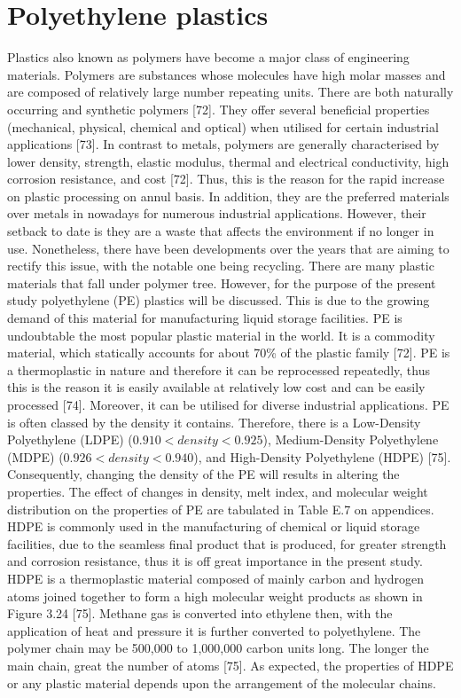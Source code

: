 \documentclass[12pt]{report}
\begin{document}
\section{Polyethylene plastics}
Plastics also known as polymers have become a major class of engineering materials. Polymers are substances whose molecules have high molar masses and are composed of relatively large number repeating units. There are both naturally occurring and synthetic polymers [72]. They offer several beneficial properties (mechanical, physical, chemical and optical) when utilised for certain industrial applications [73]. In contrast to metals, polymers are generally characterised by lower density, strength, elastic modulus, thermal and electrical conductivity, high corrosion resistance, and cost [72]. Thus, this is the reason for the rapid increase on plastic processing on annul basis. In addition, they are the preferred materials over metals in nowadays for numerous industrial applications. However, their setback to date is they are a waste that affects the environment if no longer in use. Nonetheless, there have been developments over the years that are aiming to rectify this issue, with the notable one being recycling.  
There are many plastic materials that fall under polymer tree. However, for the purpose of the present study polyethylene (PE) plastics will be discussed. This is due to the growing demand of this material for manufacturing liquid storage facilities. PE is undoubtable the most popular plastic material in the world. It is a commodity material, which statically accounts for about 70\% of the plastic family [72].  PE is a thermoplastic in nature and therefore it can be reprocessed repeatedly, thus this is the reason it is easily available at relatively low cost and can be easily processed [74]. Moreover, it can be utilised for diverse industrial applications. 
PE is often classed by the density it contains. Therefore, there is a Low-Density Polyethylene (LDPE) ($0.910 < density < 0.925$), Medium-Density Polyethylene (MDPE) ($0.926 < density < 0.940$), and High-Density Polyethylene (HDPE) [75]. Consequently, changing the density of the PE will results in altering the properties. The effect of changes in density, melt index, and molecular weight distribution on the properties of PE are tabulated in Table E.7 on appendices. 
HDPE is commonly used in the manufacturing of chemical or liquid storage facilities, due to the seamless final product that is produced, for greater strength and corrosion resistance, thus it is off great importance in the present study. HDPE is a thermoplastic material composed of mainly carbon and hydrogen atoms joined together to form a high molecular weight products as shown in Figure 3.24 [75]. Methane gas is converted into ethylene then, with the application of heat and pressure it is further converted to polyethylene. The polymer chain may be 500,000 to 1,000,000 carbon units long. The longer the main chain, great the number of atoms [75]. As expected, the properties of HDPE or any plastic material depends upon the arrangement of the molecular chains. 
                                             
\end{document}
